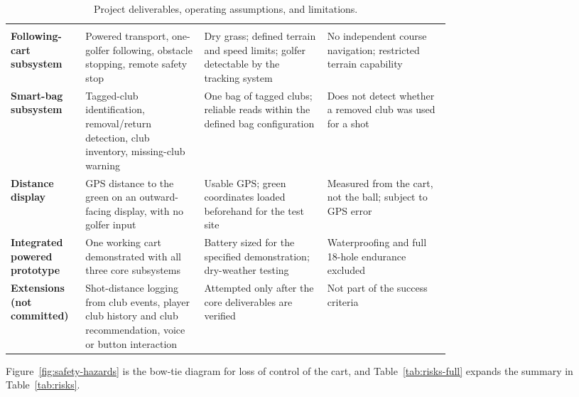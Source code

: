 \begin{singlespace}
\small
\setlength{\LTcapwidth}{\linewidth}
\begin{longtable}{@{}L{0.17\linewidth} L{0.27\linewidth} L{0.28\linewidth} L{\tabcolsep\relax}@{}}
\caption{Project deliverables, operating assumptions, and limitations.}\label{tab:intro-deliverables-full}\\
 &  &  &  \\
\midrule
\endfirsthead
{}
 &  &  &  \\
\midrule
\endhead
\bottomrule
\endfoot
\textbf{Following-cart subsystem} & Powered transport, one-golfer following, obstacle stopping, remote safety stop & Dry grass; defined terrain and speed limits; golfer detectable by the tracking system & No independent course navigation; restricted terrain capability \\
\addlinespace[3pt]
\textbf{Smart-bag subsystem} & Tagged-club identification, removal/return detection, club inventory, missing-club warning & One bag of tagged clubs; reliable reads within the defined bag configuration & Does not detect whether a removed club was used for a shot \\
\addlinespace[3pt]
\textbf{Distance display} & GPS distance to the green on an outward-facing display, with no golfer input & Usable GPS; green coordinates loaded beforehand for the test site & Measured from the cart, not the ball; subject to GPS error \\
\addlinespace[3pt]
\textbf{Integrated powered prototype} & One working cart demonstrated with all three core subsystems & Battery sized for the specified demonstration; dry-weather testing & Waterproofing and full 18-hole endurance excluded \\
\addlinespace[3pt]
\textbf{Extensions (not committed)} & Shot-distance logging from club events, player club history and club recommendation, voice or button interaction & Attempted only after the core deliverables are verified & Not part of the success criteria \\
\end{longtable}
\end{singlespace}

\label{app:risks}
Figure~\ref{fig:safety-hazards} is the bow-tie diagram for loss of control of the cart, and Table~\ref{tab:risks-full} expands the summary in Table~\ref{tab:risks}.

